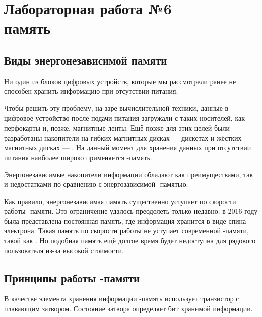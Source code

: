 \chapter{Лабораторная работа №6\\ память} 

\section{Виды энергонезависимой памяти}

\par{Ни один из блоков цифровых устройств, которые мы рассмотрели ранее не способен хранить информацию при отсутствии питания.}

\par{Чтобы решить эту проблему, на заре вычислительной техники, данные в цифровое устройство после подачи питания загружали с таких носителей, как перфокарты и, позже, магнитные ленты. Ещё позже для этих целей были разработаны накопители на гибких магнитных дисках --- дискетах и жёстких магнитных дисках --- . На данный момент для хранения данных при отсутствии питания наиболее широко применяется -память.}

\par{Энергонезависимые накопители информации обладают как преимуществами, так и недостатками по сравнению с энергозависимой -памятью.} 

\par{Как правило, энергонезависимая память существенно уступает по скорости работы -памяти. Это ограничение удалось преодолеть только недавно: в 2016 году была представлена постоянная память, где информация хранится в виде спина электрона. Такая память по скорости работы не уступает современной -памяти, такой как . Но подобная память ещё долгое время будет  недоступна для рядового пользователя из-за высокой стоимости.}

\section{Принципы работы -памяти}

\par{В качестве элемента хранения информации -память использует транзистор с плавающим затвором. Состояние затвора определяет бит хранимой информации.}

% 

